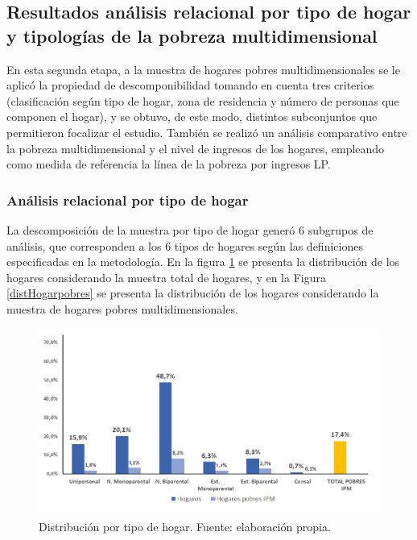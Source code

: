 \documentclass[12pt,letterpaper,spanish]{article}
\begin{document}
\subsection{Resultados análisis relacional por tipo de hogar y tipologías de la pobreza multidimensional}
En esta segunda etapa, a la muestra de hogares pobres multidimensionales se le aplicó la propiedad de descomponibilidad tomando en cuenta tres criterios (clasificación según tipo de hogar, zona de residencia y número de personas que componen el hogar), y se obtuvo, de este modo, distintos subconjuntos que permitieron focalizar el estudio. También se realizó un análisis comparativo entre la pobreza multidimensional y el nivel de ingresos de los hogares, empleando como medida de referencia la línea de la pobreza por ingresos LP.


\subsubsection{Análisis relacional por tipo de hogar}
La descomposición de la muestra por tipo de hogar generó 6 subgrupos de análisis, que corresponden a los 6 tipos de hogares según las definiciones especificadas en la metodología. En la figura \ref{distHogarTotal} se presenta la distribución de los hogares considerando la muestra total de hogares, y en la Figura \ref{distHogarpobres} se presenta la distribución de los hogares considerando la muestra de hogares pobres multidimensionales. 

\begin{figure}[H]
    \centering
    \includegraphics[width=\textwidth]{Max/distribucion_tipo_hogar_casen.png}
    \caption{Distribución por tipo de hogar. Fuente: elaboración propia.}
    \label{distHogarTotal}
\end{figure}
\end{document}

